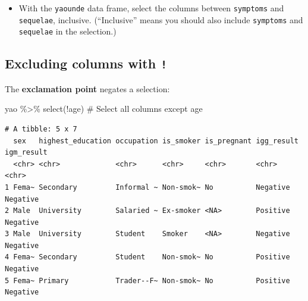 \documentclass[
  letterpaper,
  DIV=11,
  numbers=noendperiod]{scrreprt}
\newenvironment{Shaded}{\begin{snugshade}}{\end{snugshade}}
\newcommand{\CommentTok}[1]{\textcolor[rgb]{0.37,0.37,0.37}{#1}}
\newcommand{\FunctionTok}[1]{\textcolor[rgb]{0.28,0.35,0.67}{#1}}
\newcommand{\NormalTok}[1]{\textcolor[rgb]{0.00,0.23,0.31}{#1}}
\newcommand{\SpecialCharTok}[1]{\textcolor[rgb]{0.37,0.37,0.37}{#1}}
\providecommand{\tightlist}{%
  \setlength{\itemsep}{0pt}\setlength{\parskip}{0pt}}\usepackage{longtable,booktabs,array}
\begin{document}
\begin{tcolorbox}[enhanced jigsaw, colframe=quarto-callout-tip-color-frame, rightrule=.15mm, opacityback=0, breakable, coltitle=black, colbacktitle=quarto-callout-tip-color!10!white, bottomrule=.15mm, leftrule=.75mm, toprule=.15mm, arc=.35mm, bottomtitle=1mm, colback=white, left=2mm, opacitybacktitle=0.6, titlerule=0mm, title=\textcolor{quarto-callout-tip-color}{\faLightbulb}\hspace{0.5em}{Practice}, toptitle=1mm]

\begin{itemize}
\tightlist
\item
  With the \texttt{yaounde} data frame, select the columns between
  \texttt{symptoms} and \texttt{sequelae}, inclusive. (``Inclusive''
  means you should also include \texttt{symptoms} and \texttt{sequelae}
  in the selection.)
\end{itemize}

\end{tcolorbox}

\hypertarget{excluding-columns-with}{%
\subsection{\texorpdfstring{Excluding columns with
\texttt{!}}{Excluding columns with !}}\label{excluding-columns-with}}

The \textbf{exclamation point} negates a selection:

\begin{Shaded}
\begin{Highlighting}[]
\NormalTok{yao }\SpecialCharTok{\%\textgreater{}\%} \FunctionTok{select}\NormalTok{(}\SpecialCharTok{!}\NormalTok{age) }\CommentTok{\# Select all columns except \textasciigrave{}age\textasciigrave{}}
\end{Highlighting}
\end{Shaded}

\begin{verbatim}
# A tibble: 5 x 7
  sex   highest_education occupation is_smoker is_pregnant igg_result igm_result
  <chr> <chr>             <chr>      <chr>     <chr>       <chr>      <chr>     
1 Fema~ Secondary         Informal ~ Non-smok~ No          Negative   Negative  
2 Male  University        Salaried ~ Ex-smoker <NA>        Positive   Negative  
3 Male  University        Student    Smoker    <NA>        Negative   Negative  
4 Fema~ Secondary         Student    Non-smok~ No          Positive   Negative  
5 Fema~ Primary           Trader--F~ Non-smok~ No          Positive   Negative  
\end{verbatim}
\end{document}
